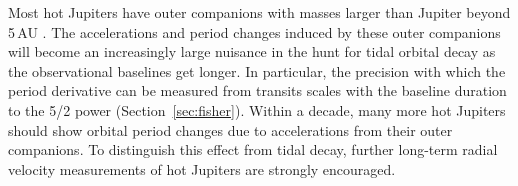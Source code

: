 \documentclass[12pt,twocolumn,tighten]{aastex62}
\begin{document}
Most hot Jupiters have outer companions with masses larger than
Jupiter beyond 5$\,$AU
\citep{knutson_friends_2014,bryan_statistics_2016}. The accelerations
and period changes induced by these outer companions will become an
increasingly large nuisance in the hunt for tidal orbital decay as the
observational baselines get longer.  In particular, the precision with
which the period derivative can be measured from transits scales with
the baseline duration to the 5/2 power (Section~\ref{sec:fisher}).
Within a decade, many more hot Jupiters should show orbital period
changes due to accelerations from their outer companions.  To
distinguish this effect from tidal decay, further long-term radial
velocity measurements of hot Jupiters are strongly encouraged.

\end{document}
